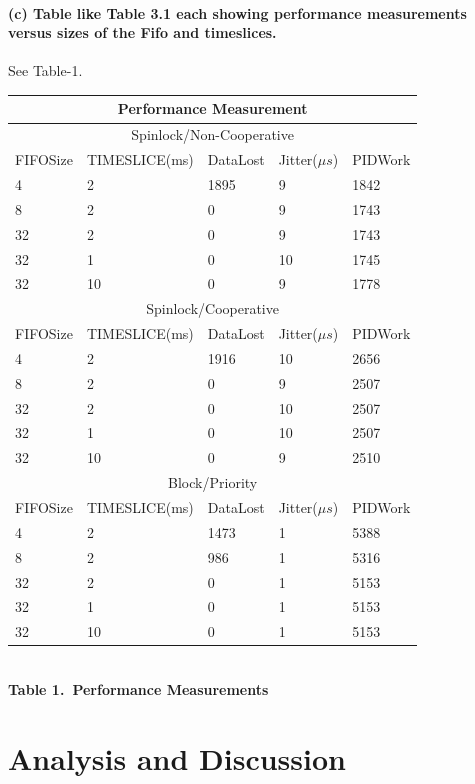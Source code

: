 \documentclass[a4paper]{article}
\begin{document}
\paragraph{(c) Table like Table 3.1 each showing performance measurements versus sizes of
the Fifo and timeslices. \\}
See Table-1.

\begin{center}
\begin{tabular}{|l|l|l|l|l|}
\hline
\multicolumn{5}{|c|}{Performance Measurement} \\
\hline
\multicolumn{5}{|c|}{Spinlock/Non-Cooperative} \\
\hline
FIFOSize  &  TIMESLICE(ms)  &  DataLost  &  Jitter($\mu s$)  &  PIDWork\\
\hline
4  &  2  &  1895  &  9  &  1842\\
8  &  2  &  0  &  9  &  1743\\
32  &  2  &  0  &  9  &  1743\\
32  &  1  &  0  &  10  &  1745\\
32  &  10  &  0  &  9  &  1778\\
\hline
\multicolumn{5}{|c|}{Spinlock/Cooperative} \\
\hline
FIFOSize  &  TIMESLICE(ms)  &  DataLost  &  Jitter($\mu s$)  &  PIDWork\\
\hline
4  &  2  &  1916  &  10  &  2656\\
8  &  2  &  0  &  9  &  2507\\
32  &  2  &  0  &  10  &  2507\\
32  &  1  &  0  &  10  &  2507\\
32  &  10  &  0  &  9  &  2510\\
\hline
\multicolumn{5}{|c|}{Block/Priority} \\
\hline
FIFOSize  &  TIMESLICE(ms)  &  DataLost  &  Jitter($\mu s$)  &  PIDWork\\
\hline
4  &  2  &  1473  &  1  &  5388\\
8  &  2  &  986  &  1  &  5316\\
32  &  2  &  0  &  1  &  5153\\
32  &  1  &  0  &  1  &  5153\\
32  &  10  &  0  &  1  &  5153 \\
\hline
\end{tabular}
\label{PM}\\
\textbf{Table 1.\ Performance Measurements}
\end{center}

\section{Analysis and Discussion}
\end{document}
